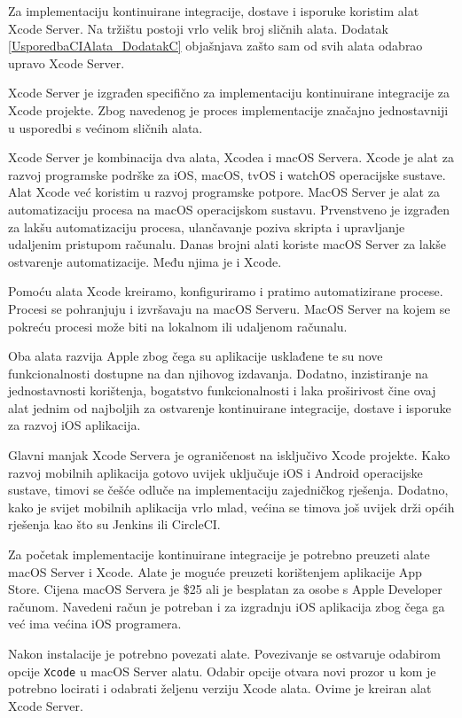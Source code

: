 \documentclass[times, utf8, diplomski, numeric]{fer}
\begin{document}
Za implementaciju kontinuirane integracije, dostave i isporuke koristim alat Xcode Server. Na tržištu postoji vrlo velik broj sličnih alata. Dodatak \ref{UsporedbaCIAlata_DodatakC} objašnjava zašto sam od svih alata odabrao upravo Xcode Server.

Xcode Server je izgrađen specifično za implementaciju kontinuirane integracije za Xcode projekte. Zbog navedenog je proces implementacije značajno jednostavniji u usporedbi s većinom sličnih alata.

Xcode Server je kombinacija dva alata, Xcodea i macOS Servera. Xcode je alat za razvoj programske podrške za iOS, macOS, tvOS i watchOS operacijske sustave. Alat Xcode već koristim u razvoj programske potpore. MacOS Server je alat za automatizaciju procesa na macOS operacijskom sustavu. Prvenstveno je izgrađen za lakšu automatizaciju procesa, ulančavanje poziva skripta i upravljanje udaljenim pristupom računalu. Danas brojni alati koriste macOS Server za lakše ostvarenje automatizacije. Među njima je i Xcode.

Pomoću alata Xcode kreiramo, konfiguriramo i pratimo automatizirane procese. Procesi se pohranjuju i izvršavaju na macOS Serveru. MacOS Server na kojem se pokreću procesi može biti na lokalnom ili udaljenom računalu.

Oba alata razvija Apple zbog čega su aplikacije usklađene te su nove funkcionalnosti dostupne na dan njihovog izdavanja. Dodatno, inzistiranje na jednostavnosti korištenja, bogatstvo funkcionalnosti i laka proširivost čine ovaj alat jednim od najboljih za ostvarenje kontinuirane integracije, dostave i isporuke za razvoj iOS aplikacija.

Glavni manjak Xcode Servera je ograničenost na isključivo Xcode projekte. Kako razvoj mobilnih aplikacija gotovo uvijek uključuje iOS i Android operacijske sustave, timovi se češće odluče na implementaciju zajedničkog rješenja. Dodatno, kako je svijet mobilnih aplikacija vrlo mlad, većina se timova još uvijek drži općih rješenja kao što su Jenkins ili CircleCI.

Za početak implementacije kontinuirane integracije je potrebno preuzeti alate macOS Server i Xcode. Alate je moguće preuzeti korištenjem aplikacije App Store. Cijena macOS Servera je \$25 ali je besplatan za osobe s Apple Developer računom. Navedeni račun je potreban i za izgradnju iOS aplikacija zbog čega ga već ima većina iOS programera.

Nakon instalacije je potrebno povezati alate. Povezivanje se ostvaruje odabirom opcije \verb|Xcode| u macOS Server alatu. Odabir opcije otvara novi prozor u kom je potrebno locirati i odabrati željenu verziju Xcode alata. Ovime je kreiran alat Xcode Server.
\end{document}
